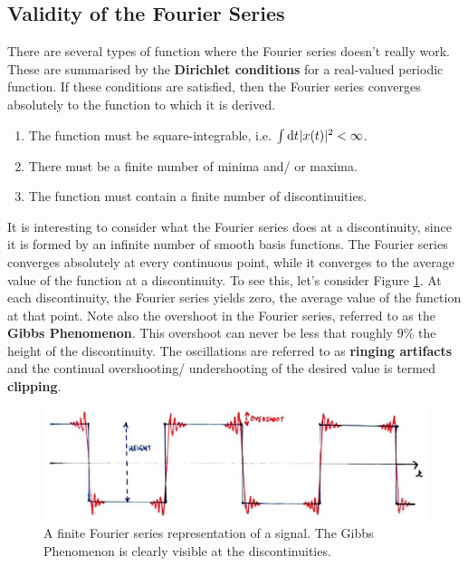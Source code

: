 \subsection{Validity of the Fourier Series}
%
There are several types of function where the Fourier series doesn't really work. These
are summarised by the \textbf{Dirichlet conditions} for a real-valued periodic function. If these
conditions are satisfied, then the Fourier series converges absolutely to the
function to which it is derived.
%
\begin{enumerate}
\item The function must be square-integrable, i.e. $\int \mathrm{d}t\mkern1mu|x(t)|^2 < \infty$.
\item There must be a finite number of minima and/ or maxima.
\item The function must contain a finite number of discontinuities.
\end{enumerate}
%
It is interesting to consider what the Fourier series does at a discontinuity,
since it is formed by an infinite number of smooth basis functions. The Fourier
series converges absolutely at every continuous point, while it converges to the
average value of the function at a discontinuity. To see this, let's consider Figure \ref{fig::lecture_4_gibbs}.
At each discontinuity, the Fourier series yields zero, the average value of the function
at that point. Note also the overshoot in the Fourier series, referred to as the \textbf{Gibbs
Phenomenon}. This overshoot can never be less that roughly $9\%$ the height of the
discontinuity. The oscillations are referred to as \textbf{ringing artifacts} and the
continual overshooting/ undershooting of the desired value is termed \textbf{clipping}. 
%
\begin{figure}[!htb]
  \includegraphics[width=\textwidth]{images/lecture_4_gibbs.JPG}
  \caption{
    A finite Fourier series representation of a signal. The Gibbs Phenomenon
    is clearly visible at the discontinuities.
  }
  \label{fig::lecture_4_gibbs}
\end{figure}


